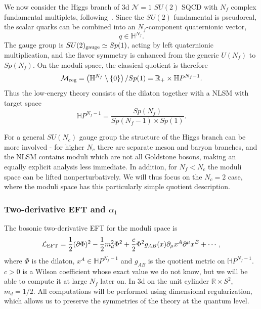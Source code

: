 \documentclass[a4paper,11pt]{article}
\begin{document}
We now consider the Higgs branch of 3d $\mathcal N=1$ $SU(2)$ SQCD with $N_f$ complex fundamental multiplets, following~\cite{Gaiotto:2018yjh}. Since the $SU(2)$ fundamental is pseudoreal, the scalar quarks can be combined into an $N_f$-component quaternionic vector,
\begin{equation}
  q\in \mathbb H^{N_f}.
\end{equation}
The gauge group is $SU(2)_{\rm gauge}\simeq Sp(1)$, acting by left quaternionic multiplication, and the flavor symmetry is enhanced from the generic $U(N_f)$ to $  Sp(N_f)$. On the moduli space, the classical quotient is therefore
\begin{equation}
  \mathcal M_{\rm reg} = \left(\mathbb H^{N_f}\setminus\{0\}\right)/Sp(1) = \mathbb R_+\times \mathbb HP^{N_f-1}.
\end{equation}
Thus the low-energy theory consists of the dilaton together with a NLSM with target space
\begin{equation}
  \mathbb HP^{N_f-1} = \frac{Sp(N_f)}{Sp(N_f-1)\times Sp(1)}.
\end{equation}

For a general $SU(N_c)$ gauge group the structure of the Higgs branch can be more involved - for higher $N_c$ there are separate meson and baryon branches, and the NLSM contains moduli which are not all Goldstone bosons, making an equally explicit analysis less immediate. In addition, for $N_f<N_c$ the moduli space can be lifted nonperturbatively. We will thus focus on the $N_c=2$ case, where the moduli space has this particularly simple quotient description.


\subsubsection{Two-derivative EFT and $\alpha_1$}


The bosonic two-derivative EFT for the moduli space is
\begin{equation}
  \mathcal L_{\rm EFT}
  =
  \frac12(\partial\Phi)^2
  -\frac12 m_d^2\Phi^2
  +\frac c2\Phi^2 g_{AB}(x)\partial_\mu x^A\partial^\mu x^B
  +\cdots,
  \label{eq:sqcd-eft}
\end{equation}
where $\Phi$ is the dilaton, $x^A\in \mathbb HP^{N_f-1}$ and $g_{AB}$ is the quotient metric on $\mathbb HP^{N_f-1}$. $c>0$ is a Wilson coefficient whose exact value we do not know, but we will be able to compute it at large $N_f$ later on. In 3d on the unit cylinder $\mathbb R\times S^2$, $m_d=1/2$. All computations will be performed using dimensional regularization, which allows us to preserve the symmetries of the theory at the quantum level.
\end{document}
